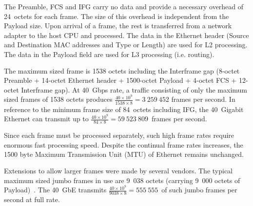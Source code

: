 The Preamble, FCS and IFG carry no data and provide a necessary overhead of 24~octets for each frame.
The size of this overhead is independent from the Payload size.
Upon arrival of a frame, the rest is transferred from a network adapter to the host CPU and processed.
The data in the Ethernet header (Source and Destination MAC addresses and Type or Length) are used for L2 processing.
The data in the Payload field are used for L3 processing (i.e. routing).

The maximum sized frame is 1538 octets including the Interframe gap
(8-octet Preamble + 14-octet Ethernet header + 1500-octet Payload + 4-octet FCS + 12-octet Interframe gap).
At 40~Gbps rate, a traffic consisting of only the maximum sized frames of 1538 octets
produces $\frac{40 \times 10^{9}}{1538 \times 8} = 3~259~452$ frames per second.
In reference to the minimum frame size of 84~octets including IFG,
the 40~Gigabit Ethernet can transmit up to $\frac{40 \times 10^{9}}{84 \times 8} = 59~523~809$~frames per second.

Since each frame must be processed separately,
such high frame rates require enormous fast processing speed.
Despite the continual frame rates increases,
the 1500 byte Maximum Transmission Unit (MTU) of Ethernet remains unchanged.

Extensions to allow larger frames were made by several vendors.
The typical maximum sized jumbo frames in use are 9~038 octets (carrying 9~000 octets of Payload)~\cite{ea-jumbo-frames}.
The 40~GbE transmits $\frac{40 \times 10^{9}}{9038 \times 8} = 555~555$~of such jumbo frames per second at full rate.

